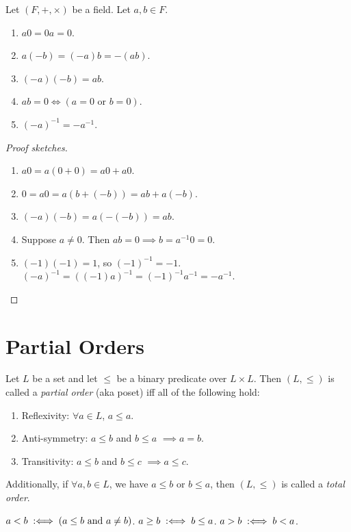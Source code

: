 \documentclass[a4paper, 12pt, fleqn]{article}
\begin{document}
\begin{lemma}
\label{thm:field-basics}
Let $(F, +, \times)$ be a field. Let $a, b \in F$.
\begin{enumerate}
\item $a0 = 0a = 0$.
\item $a(-b) = (-a)b = -(ab)$.
\item $(-a)(-b) = ab$.
\item \label{item:field-basics:zero-prod}$ab = 0 \iff (a = 0 \textrm{ or } b = 0)$.
\item $(-a)^{-1} = -a^{-1}$.
\end{enumerate}
\end{lemma}
\begin{proof}[Proof sketches]
\leavevmode
\begin{enumerate}
\item $a0 = a(0 + 0) = a0 + a0$.
\item $0 = a0 = a(b + (-b)) = ab + a(-b)$.
\item $(-a)(-b) = a(-(-b)) = ab$.
\item Suppose $a \neq 0$. Then $ab = 0 \implies b = a^{-1}0 = 0$.
\item $(-1)(-1) = 1$, so $(-1)^{-1} = -1$. $(-a)^{-1} = ((-1)a)^{-1} = (-1)^{-1}a^{-1} = -a^{-1}$.
\end{enumerate}
\end{proof}

\section{Partial Orders}

\begin{definition}
Let $L$ be a set and let $\le$ be a binary predicate over $L \times L$.
Then $(L, \le)$ is called a \emph{partial order} (aka poset) iff all of the following hold:
\begin{enumerate}
\item Reflexivity: $\forall a \in L$, $a \le a$.
\item Anti-symmetry: $a \le b$ and $b \le a$ $\implies a = b$.
\item Transitivity: $a \le b$ and $b \le c$ $\implies a \le c$.
\end{enumerate}
Additionally, if $\forall a, b \in L$, we have $a \le b$ or $b \le a$,
then $(L, \le)$ is called a \emph{total order}.

$a < b \;:\Longleftrightarrow\; (a \le b \textrm{ and } a \neq b)$.
$a \ge b \;:\Longleftrightarrow\; b \le a$. $a > b \;:\Longleftrightarrow\; b < a$.
\end{definition}
\end{document}
